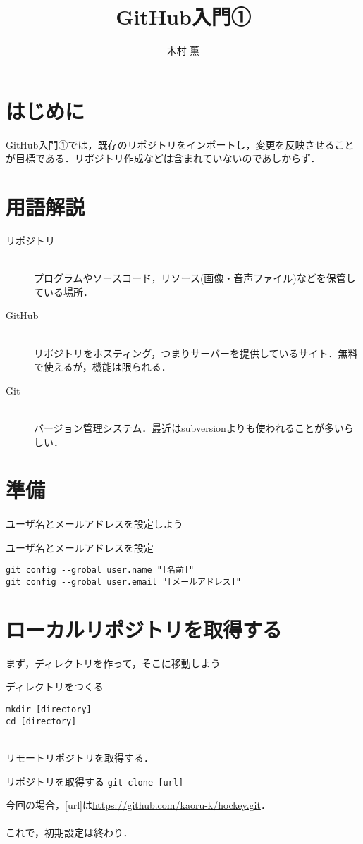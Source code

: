 \documentclass{jarticle}
\title{GitHub入門①}
\author{木村 薫}
\begin{document}
\maketitle
\section{はじめに}
GitHub入門①では，既存のリポジトリをインポートし，変更を反映させることが目標である．リポジトリ作成などは含まれていないのであしからず．
%
\section{用語解説}
\begin{description}
\item[リポジトリ]\mbox{}\\
  プログラムやソースコード，リソース(画像・音声ファイル)などを保管している場所．
\item[GitHub]\mbox{}\\
  リポジトリをホスティング，つまりサーバーを提供しているサイト．無料で使えるが，機能は限られる．
\item[Git]\mbox{}\\
  バージョン管理システム．最近はsubversionよりも使われることが多いらしい．
\end{description}
%
\section{準備}
ユーザ名とメールアドレスを設定しよう\\
\begin{itembox}[l]{ユーザ名とメールアドレスを設定}
\begin{verbatim}
git config --grobal user.name "[名前]"
git config --grobal user.email "[メールアドレス]"
\end{verbatim}
\end{itembox}
\section{ローカルリポジトリを取得する}
まず，ディレクトリを作って，そこに移動しよう\\
\begin{itembox}[l]{ディレクトリをつくる}
\begin{verbatim}
mkdir [directory]
cd [directory]
\end{verbatim}
\end{itembox}
\\
リモートリポジトリを取得する．\\
\begin{itembox}[l]{リポジトリを取得する}
{\tt git clone [url]}
\end{itembox}
今回の場合，[url]は\url{https://github.com/kaoru-k/hockey.git}．\\
\\
これで，初期設定は終わり．
%
\end{document}
